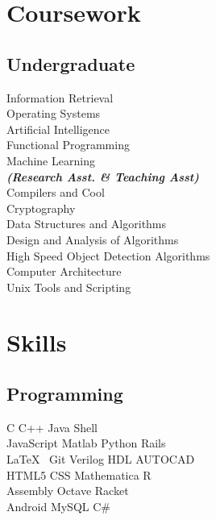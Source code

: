 \documentclass[]{font}
\begin{document}
\begin{minipage}[t]{0.33\textwidth}
\section{Coursework}

\subsection{Undergraduate}
Information Retrieval \\
Operating Systems \\
Artificial Intelligence\\
Functional Programming \\
Machine Learning\\
{\footnotesize \textit{\textbf{(Research Asst. \& Teaching Asst) }}} \\
Compilers and Cool\\
Cryptography\\
Data Structures and Algorithms\\
Design and Analysis of Algorithms\\
High Speed Object Detection Algorithms\\
Computer Architecture\\
Unix Tools and Scripting \\
\sectionsep


\section{Skills}
\subsection{Programming}
C \textbullet{} C++ \textbullet{} Java \textbullet{}   Shell \\
JavaScript \textbullet{} Matlab \textbullet{} Python \textbullet{} Rails\\  
\LaTeX\ \textbullet{} Git \textbullet{} Verilog HDL  \textbullet{} AUTOCAD\\ 
HTML5 \textbullet{} CSS \textbullet{} Mathematica \textbullet{} R \\
Assembly \textbullet{} Octave \textbullet{} Racket\\
Android \textbullet{} MySQL \textbullet{} C\#
\sectionsep

%
%

\end{minipage} 
\end{document}
